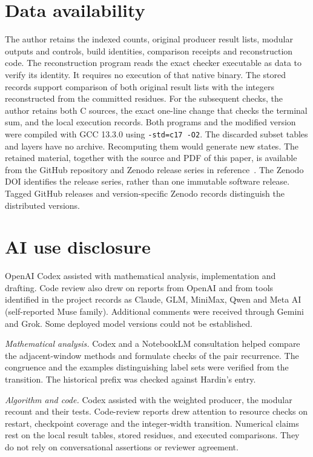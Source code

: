 \documentclass[11pt]{article}
\begin{document}
\section*{Data availability}
The author retains the indexed counts, original producer result lists,
modular outputs and controls, build identities, comparison receipts and
reconstruction code. The reconstruction program reads the exact checker
executable as data to verify its identity. It requires no execution of
that native binary. The stored records support comparison of both original
result lists with the integers reconstructed from the committed residues.
For the subsequent checks, the author retains both C sources, the exact
one-line change that checks the terminal sum, and the local execution
records. Both programs and the modified version were compiled with
GCC 13.3.0 using \texttt{-std=c17 -O2}.
The discarded subset tables and layers have no archive. Recomputing them
would generate new states. The retained material, together with the source and PDF of this paper,
is available from the GitHub repository and Zenodo release series in
reference~\cite{project}. The Zenodo DOI identifies the release series,
rather than one immutable software release. Tagged GitHub releases and
version-specific Zenodo records distinguish the distributed versions.

\section*{AI use disclosure}
OpenAI Codex assisted with mathematical analysis, implementation and
drafting. Code review also drew on reports from OpenAI and from tools
identified in the project records as Claude, GLM, MiniMax, Qwen and
Meta AI (self-reported Muse family). Additional comments were received through Gemini and
Grok. Some deployed model versions could not be established.

\noindent\textit{Mathematical analysis.}
Codex and a NotebookLM consultation helped compare the adjacent-window
methods and formulate checks of the pair recurrence. The congruence and
the examples distinguishing label sets were verified from the transition.
The historical prefix was checked against Hardin's entry.

\noindent\textit{Algorithm and code.}
Codex assisted with the weighted producer, the modular recount and
their tests. Code-review reports drew attention to resource checks on
restart, checkpoint coverage and the integer-width transition. Numerical
claims rest on the local result tables, stored residues, and executed
comparisons. They do not rely on conversational assertions or reviewer
agreement.
\end{document}
